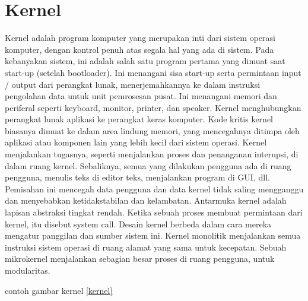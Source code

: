 
	
	\section{Kernel}
	 Kernel adalah program komputer yang merupakan inti dari sistem operasi komputer, dengan kontrol penuh atas segala hal yang ada di sistem. Pada kebanyakan sistem, ini adalah salah satu program pertama yang dimuat
	 saat start-up (setelah bootloader). 
	 Ini menangani sisa start-up serta permintaan input / output dari perangkat lunak, menerjemahkannya ke dalam instruksi pengolahan data untuk unit pemrosesan pusat. Ini menangani memori dan periferal seperti keyboard, 
	 monitor, printer, dan speaker.
	 Kernel menghubungkan perangkat lunak aplikasi ke perangkat keras komputer.
	 Kode kritis kernel biasanya dimuat ke dalam area lindung memori, yang mencegahnya ditimpa oleh aplikasi atau komponen lain yang lebih kecil dari sistem operasi. Kernel menjalankan tugasnya, seperti menjalankan proses 
	 dan penanganan interupsi, di dalam ruang kernel. 
	 Sebaliknya, semua yang dilakukan pengguna ada di ruang pengguna, menulis teks di editor teks, menjalankan program di GUI, dll. Pemisahan ini mencegah data pengguna dan data kernel tidak saling mengganggu dan menyebabkan 
	 ketidakstabilan dan kelambatan. 
	 Antarmuka kernel adalah lapisan abstraksi tingkat rendah. Ketika sebuah proses membuat permintaan dari kernel, itu disebut system call. Desain kernel berbeda dalam cara mereka mengatur panggilan dan sumber sistem ini. 
	 Kernel monolitik menjalankan semua instruksi sistem operasi di ruang alamat yang sama untuk kecepatan. Sebuah mikrokernel menjalankan sebagian besar proses di ruang pengguna, untuk modularitas. 
	
	contoh gambar kernel \ref{kernel}


